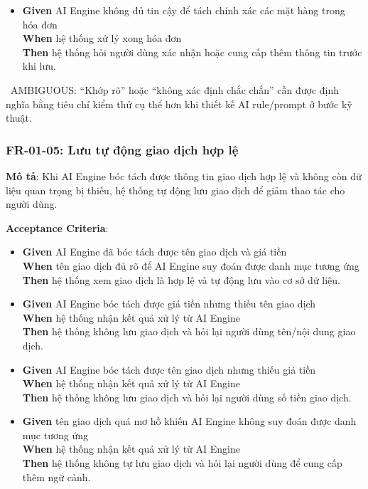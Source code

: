 \begin{itemize}
\item \textbf{Given} AI Engine không đủ tin cậy để tách chính xác các mặt hàng trong hóa đơn  \\ \hspace*{1.5em}  \textbf{When} hệ thống xử lý xong hóa đơn  \\ \hspace*{1.5em}  \textbf{Then} hệ thống hỏi người dùng xác nhận hoặc cung cấp thêm thông tin trước khi lưu.
\end{itemize}
\warningicon\  AMBIGUOUS: “Khớp rõ” hoặc “không xác định chắc chắn” cần được định nghĩa bằng tiêu chí kiểm thử cụ thể hơn khi thiết kế AI rule/prompt ở bước kỹ thuật.



\subsubsection{FR-01-05: Lưu tự động giao dịch hợp lệ}

\textbf{Mô tả}: Khi AI Engine bóc tách được thông tin giao dịch hợp lệ và không còn dữ liệu quan trọng bị thiếu, hệ thống tự động lưu giao dịch để giảm thao tác cho người dùng.



\textbf{Acceptance Criteria}:

\begin{itemize}
\item \textbf{Given} AI Engine đã bóc tách được tên giao dịch và giá tiền  \\ \hspace*{1.5em}  \textbf{When} tên giao dịch đủ rõ để AI Engine suy đoán được danh mục tương ứng  \\ \hspace*{1.5em}  \textbf{Then} hệ thống xem giao dịch là hợp lệ và tự động lưu vào cơ sở dữ liệu.
\item \textbf{Given} AI Engine bóc tách được giá tiền nhưng thiếu tên giao dịch  \\ \hspace*{1.5em}  \textbf{When} hệ thống nhận kết quả xử lý từ AI Engine  \\ \hspace*{1.5em}  \textbf{Then} hệ thống không lưu giao dịch và hỏi lại người dùng tên/nội dung giao dịch.
\item \textbf{Given} AI Engine bóc tách được tên giao dịch nhưng thiếu giá tiền  \\ \hspace*{1.5em}  \textbf{When} hệ thống nhận kết quả xử lý từ AI Engine  \\ \hspace*{1.5em}  \textbf{Then} hệ thống không lưu giao dịch và hỏi lại người dùng số tiền giao dịch.
\item \textbf{Given} tên giao dịch quá mơ hồ khiến AI Engine không suy đoán được danh mục tương ứng  \\ \hspace*{1.5em}  \textbf{When} hệ thống nhận kết quả xử lý từ AI Engine  \\ \hspace*{1.5em}  \textbf{Then} hệ thống không tự lưu giao dịch và hỏi lại người dùng để cung cấp thêm ngữ cảnh.
\end{itemize}
